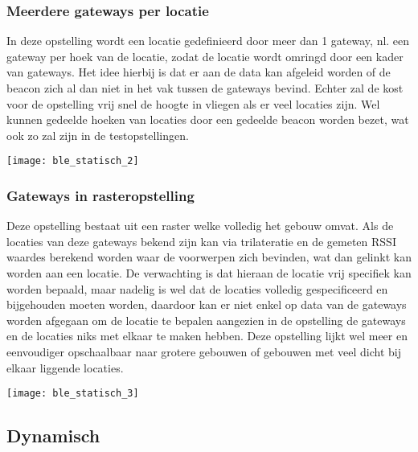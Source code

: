 \subsubsection{Meerdere gateways per locatie}
\begin{minipage}{0.65\textwidth}
In deze opstelling wordt een locatie gedefinieerd door meer dan 1 gateway, nl. een gateway per hoek van de locatie, zodat de locatie wordt omringd door een kader van gateways. Het idee hierbij is dat er aan de data kan afgeleid worden of de beacon zich al dan niet in het vak tussen de gateways bevind. Echter zal de kost voor de opstelling vrij snel de hoogte in vliegen als er veel locaties zijn. Wel kunnen gedeelde hoeken van locaties door een gedeelde beacon worden bezet, wat ook zo zal zijn in de testopstellingen.
\end{minipage}
\hfill
\begin{minipage}{0.30\textwidth}
	\texttt{[image: ble\_statisch\_2]}
\end{minipage}

\subsubsection{Gateways in rasteropstelling}
\begin{minipage}{0.65\textwidth}
Deze opstelling bestaat uit een raster welke volledig het gebouw omvat. Als de locaties van deze gateways bekend zijn kan via trilateratie en de gemeten RSSI waardes berekend worden waar de voorwerpen zich bevinden, wat dan gelinkt kan worden aan een locatie. De verwachting is dat hieraan de locatie vrij specifiek kan worden bepaald, maar nadelig is wel dat de locaties volledig gespecificeerd en bijgehouden moeten worden, daardoor kan er niet enkel op data van de gateways worden afgegaan om de locatie te bepalen aangezien in de opstelling de gateways en de locaties niks met elkaar te maken hebben. Deze opstelling lijkt wel meer en eenvoudiger opschaalbaar naar grotere gebouwen of gebouwen met veel dicht bij elkaar liggende locaties.
\end{minipage}
\hfill
\begin{minipage}{0.30\textwidth}
	\texttt{[image: ble\_statisch\_3]}
\end{minipage}


\subsection{Dynamisch}

